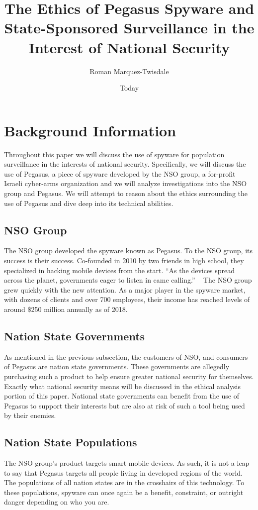 \documentclass[sigconf]{acmart}
\begin{document}
\title{The Ethics of Pegasus Spyware and State-Sponsored Surveillance in the Interest of National Security}
\author{Roman Marquez-Twisdale}

\date{Today}
\maketitle

\section{Background Information}
Throughout this paper we will discuss the use of spyware for population surveillance in the interests of national security. Specifically, we will discuss the use of Pegasus, a piece of spyware developed by the NSO group, a for-profit Israeli cyber-arms organization and we will analyze investigations into the NSO group and Pegasus. We will attempt to reason about the ethics surrounding the use of Pegasus and dive deep into its technical abilities.
\subsection{NSO Group}
The NSO group developed the spyware known as Pegasus. To the NSO group, its success is their success. Co-founded in 2010 by two friends in high school, they specialized in hacking mobile devices from the start. “As the devices spread across the planet, governments eager to listen in came calling.” ~\cite{used_first(7)} The NSO group grew quickly with the new attention. As a major player in the spyware market, with dozens of clients and over 700 employees, their income has reached levels of around \$250 million annually as of 2018.
\subsection{Nation State Governments}
As mentioned in the previous subsection, the customers of NSO, and consumers of Pegasus are nation state governments. These governments are allegedly purchasing such a product to help ensure greater national security for themselves. Exactly what national security means will be discussed in the ethical analysis portion of this paper. National state governments can benefit from the use of Pegasus to support their interests but are also at risk of such a tool being used by their enemies.
\subsection{Nation State Populations}
The NSO group’s product targets smart mobile devices. As such, it is not a leap to say that Pegasus targets all people living in developed regions of the world. The populations of all nation states are in the crosshairs of this technology. To these populations, spyware can once again be a benefit, constraint, or outright danger depending on who you are.
\end{document}
